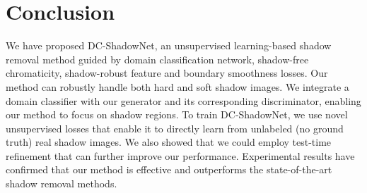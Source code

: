 \documentclass[10pt,twocolumn,letterpaper]{article}
\begin{document}
\section{Conclusion}
\label{sec:conclusion}
We have proposed DC-ShadowNet, an unsupervised learning-based shadow removal method guided by domain classification network, shadow-free chromaticity, shadow-robust feature and boundary smoothness losses. 
Our method can robustly handle both hard and soft shadow images. 
We integrate a domain classifier with our generator and its corresponding discriminator, enabling our method to focus on shadow regions.
To train DC-ShadowNet, we use novel unsupervised losses that enable it to directly learn from unlabeled (no ground truth) real shadow images.   
We also showed that we could employ test-time refinement that can further improve our performance. 
Experimental results have confirmed that our method is effective and outperforms the state-of-the-art shadow removal methods.


{\small
	
	
}
\end{document}
